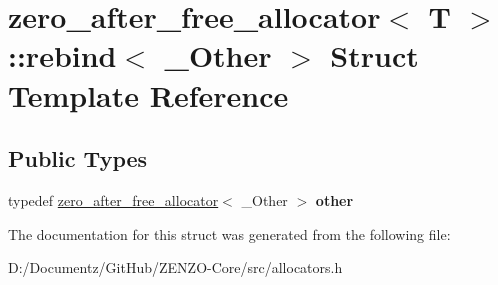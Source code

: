 \hypertarget{structzero__after__free__allocator_1_1rebind}{}\section{zero\+\_\+after\+\_\+free\+\_\+allocator$<$ T $>$\+::rebind$<$ \+\_\+\+Other $>$ Struct Template Reference}
\label{structzero__after__free__allocator_1_1rebind}
\subsection*{Public Types}
\begin{DoxyCompactItemize}
\item 
\mbox{\label{structzero__after__free__allocator_1_1rebind_aef5ba2251ba370df22fbd0a05e3cf284}} 
typedef \mbox{\hyperlink{structzero__after__free__allocator}{zero\+\_\+after\+\_\+free\+\_\+allocator}}$<$ \+\_\+\+Other $>$ {\bfseries other}
\end{DoxyCompactItemize}


The documentation for this struct was generated from the following file\+:\begin{DoxyCompactItemize}
\item 
D\+:/\+Documentz/\+Git\+Hub/\+Z\+E\+N\+Z\+O-\/\+Core/src/allocators.\+h\end{DoxyCompactItemize}
